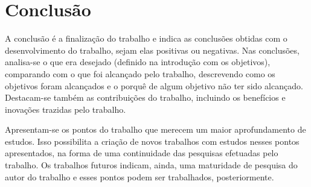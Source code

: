 \documentclass[12pt]{tcc}
\begin{document}
\chapter{Conclusão}
	\label{sec:conclusao}

	A conclusão é a finalização do trabalho e indica as conclusões obtidas com o desenvolvimento do trabalho, sejam elas positivas ou negativas. Nas conclusões, analisa-se o que era desejado (definido na introdução com os objetivos), comparando com o que foi alcançado pelo trabalho, descrevendo como os objetivos foram alcançados e o porquê de algum objetivo não ter sido alcançado. Destacam-se também as contribuições do trabalho, incluindo os benefícios e inovações trazidas pelo trabalho.

Apresentam-se os pontos do trabalho que merecem um maior aprofundamento de estudos. Isso possibilita a criação de novos trabalhos com estudos nesses pontos apresentados, na forma de uma continuidade das pesquisas efetuadas pelo trabalho. Os trabalhos futuros indicam, ainda, uma maturidade de pesquisa do autor do trabalho e esses pontos podem ser trabalhados, posteriormente.

\label{bibpage}
\renewcommand\bibname{Referências}

%

\label{bibfinalpage}

\label{lastpage}
\end{document}
